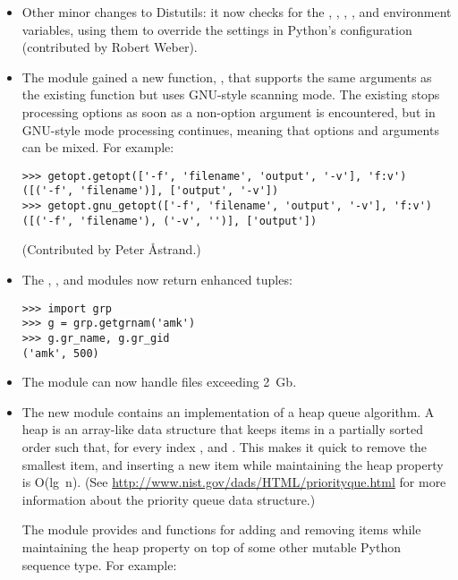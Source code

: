 \documentclass{howto}
\begin{document}
\begin{itemize}
\item Other minor changes to Distutils:
it now checks for the , , ,
, and  environment variables, using
them to override the settings in Python's configuration (contributed
by Robert Weber).

\item The  module gained a new function,
, that supports the same arguments as the existing
 function but uses GNU-style scanning mode.
The existing  stops processing options as soon as a
non-option argument is encountered, but in GNU-style mode processing
continues, meaning that options and arguments can be mixed.  For
example:

\begin{verbatim}
>>> getopt.getopt(['-f', 'filename', 'output', '-v'], 'f:v')
([('-f', 'filename')], ['output', '-v'])
>>> getopt.gnu_getopt(['-f', 'filename', 'output', '-v'], 'f:v')
([('-f', 'filename'), ('-v', '')], ['output'])
\end{verbatim}

(Contributed by Peter \AA{strand}.)

\item The , , and  modules
now return enhanced tuples:

\begin{verbatim}
>>> import grp
>>> g = grp.getgrnam('amk')
>>> g.gr_name, g.gr_gid
('amk', 500)
\end{verbatim}

\item The  module can now handle files exceeding 2~Gb.  

\item The new  module contains an implementation of a
heap queue algorithm.  A heap is an array-like data structure that
keeps items in a partially sorted order such that, for every index
,  and
.  This makes it quick to
remove the smallest item, and inserting a new item while maintaining
the heap property is O(lg~n).  (See
\url{http://www.nist.gov/dads/HTML/priorityque.html} for more
information about the priority queue data structure.)

The  module provides  and
 functions for adding and removing items while
maintaining the heap property on top of some other mutable Python
sequence type.  For example:


\end{itemize}
\end{document}

